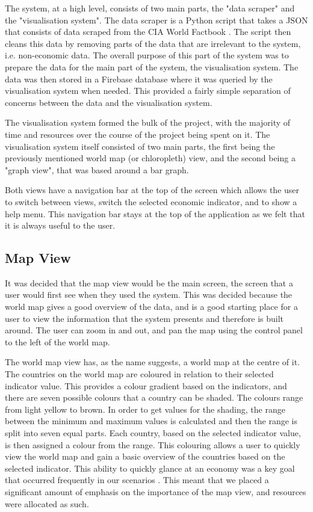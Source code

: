 \documentclass[10pt, journal]{IEEEtran}
\begin{document}
The system, at a high level, consists of two main parts, the "data scraper" and the "visualisation system". The data scraper is a Python script that takes a JSON that consists of data scraped from the CIA World Factbook \cite{cia}. The script then cleans this data by removing parts of the data that are irrelevant to the system, i.e. non-economic data. The overall purpose of this part of the system was to prepare the data for the main part of the system, the visualisation system. The data was then stored in a Firebase \cite{firebase} database where it was queried by the visualisation system when needed. This provided a fairly simple separation of concerns between the data and the visualisation system.

The visualisation system formed the bulk of the project, with the majority of time and resources over the course of the project being spent on it. The visualisation system itself consisted of two main parts, the first being the previously mentioned world map (or chloropleth) view, and the second being a "graph view", that was based around a bar graph. 

Both views have a navigation bar at the top of the screen which allows the user to switch between views, switch the selected economic indicator, and to show a help menu. This navigation bar stays at the top of the application as we felt that it is always useful to the user.

\subsection{Map View}

It was decided that the map view would be the main screen, the screen that a user would first see when they used the system. This was decided because the world map gives a good overview of the data, and is a good starting place for a user to view the information that the system presents and therefore is built around. The user can zoom in and out, and pan the map using the control panel to the left of the world map.

The world map view has, as the name suggests, a world map at the centre of it. The countries on the world map are coloured in relation to their selected indicator value. This provides a colour gradient based on the indicators, and there are seven possible colours that a country can be shaded. The colours range from light yellow to brown. In order to get values for the shading, the range between the minimum and maximum values is calculated and then the range is split into seven equal parts. Each country, based on the selected indicator value, is then assigned a colour from the range. This colouring allows a user to quickly view the world map and gain a basic overview of the countries based on the selected indicator. This ability to quickly glance at an economy was a key goal that occurred frequently in our scenarios \cite{scenarios}. This meant that we placed a significant amount of emphasis on the importance of the map view, and resources were allocated as such.
\end{document}
